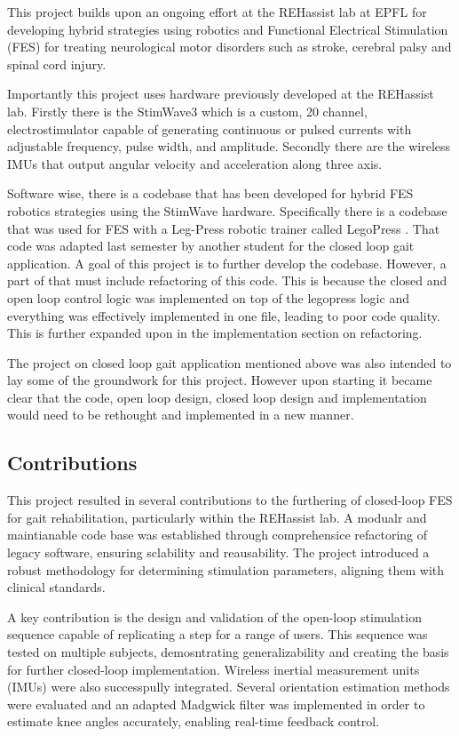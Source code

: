 This project builds upon an ongoing effort at the REHassist lab at EPFL for developing hybrid strategies using robotics and Functional Electrical Stimulation (FES) for treating neurological motor disorders such as stroke, cerebral palsy and spinal cord injury. 

Importantly this project uses hardware previously developed at the REHassist lab. Firstly there is the StimWave3 which is a custom, 20 channel, electrostimulator capable of generating continuous or pulsed currents with adjustable frequency, pulse width, and amplitude. Secondly there are the wireless IMUs that output angular velocity and acceleration along three axis. 

Software wise, there is a codebase that has been developed for hybrid FES robotics strategies using the StimWave hardware. Specifically there is a codebase that was used for FES with a Leg-Press robotic trainer called LegoPress \cite{olivier_legopress_2014}. That code was adapted last semester by another student for the closed loop gait application. A goal of this project is to further develop the codebase. However, a part of that must include refactoring of this code. This is because the closed and open loop control logic was implemented on top of the legopress logic and everything was effectively implemented in one file, leading to poor code quality. This is further expanded upon in the implementation section on refactoring.

The project on closed loop gait application mentioned above was also intended to lay some of the groundwork for this project. However upon starting it became clear that the code, open loop design, closed loop design and implementation would need to be rethought and implemented in a new manner.



\subsection{Contributions}

This project resulted in several contributions to the furthering of closed-loop FES for gait rehabilitation, particularly within the REHassist lab. A modualr and maintianable code base was established through comprehensice refactoring of legacy software, ensuring sclability and reausability. The project introduced a robust methodology for determining stimulation parameters, aligning them with clinical standards.

A key contribution is the design and validation of the open-loop stimulation sequence capable of replicating a step for a range of users. This sequence was tested on multiple subjects, demosntrating generalizability and creating the basis for further closed-loop implementation. Wireless inertial measurement units (IMUs) were also successpully integrated. Several orientation estimation methods were evaluated and an adapted Madgwick filter was implemented in order to estimate knee angles accurately, enabling real-time feedback control.


